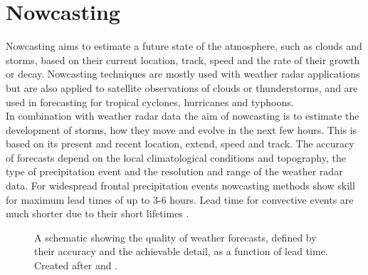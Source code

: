 \documentclass[11pt,twoside,a4paper,fleqn,x11names]{report}
\numberwithin{equation}{chapter}
\numberwithin{figure}{chapter}
\numberwithin{table}{chapter}
\begin{document}
\section{Nowcasting}
\label{chap:nowcasting}
Nowcasting aims to estimate a future state of the atmosphere, such as clouds and storms, based on their current location, track, speed and the rate of their growth or decay. Nowcasting techniques are mostly used with weather radar applications but are also applied to satellite observations of clouds or thunderstorms, and are used in forecasting for tropical cyclones, hurricanes and typhoons.\\
In combination with weather radar data the aim of nowcasting is to estimate the development of storms, how they move and evolve in the next few hours. This is based on its present and recent location, extend, speed and track. The accuracy of forecasts depend on the local climatological conditions and topography, the type of precipitation event and the resolution and range of the weather radar data. For widespread frontal precipitation events nowcasting methods show skill for maximum lead times of up to 3-6 hours. Lead time for convective events are much shorter due to their short lifetimes \citep{Sene2009}.
\begin{figure}[!htbp]
	\centering
	\caption{A schematic showing the quality of weather forecasts, defined by their accuracy and the achievable detail, as a function of lead time. Created after \cite{Pierce12} and \cite{Browning1980}.}
	\label{fig:prognosisquality}
\end{figure}\\
\end{document}
